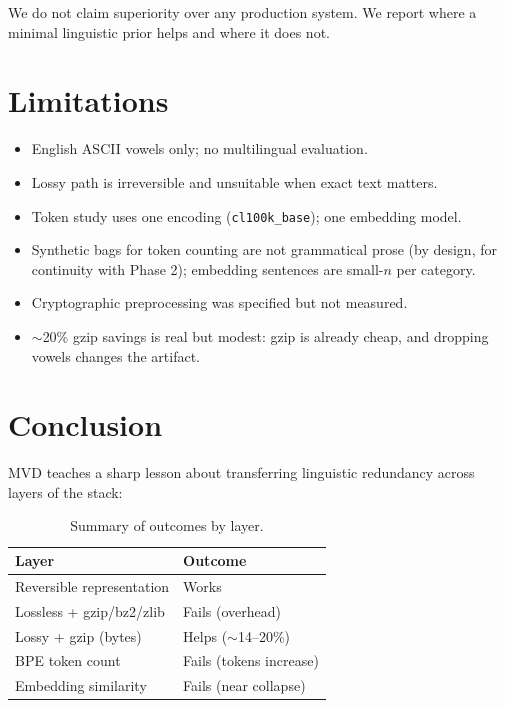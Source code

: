 \documentclass{article}
\begin{document}
We do not claim superiority over any production system. We report where a minimal linguistic prior helps and where it does not.

\section{Limitations}
\label{sec:limitations}

\begin{itemize}
	\item English ASCII vowels only; no multilingual evaluation.
	\item Lossy path is irreversible and unsuitable when exact text matters.
	\item Token study uses one encoding (\texttt{cl100k\_base}); one embedding model.
	\item Synthetic bags for token counting are not grammatical prose (by design, for continuity with Phase 2); embedding sentences are small-$n$ per category.
	\item Cryptographic preprocessing was specified but not measured.
	\item $\sim$20\% gzip savings is real but modest: gzip is already cheap, and dropping vowels changes the artifact.
\end{itemize}

\section{Conclusion}
\label{sec:conclusion}

MVD teaches a sharp lesson about transferring linguistic redundancy across layers of the stack:

\begin{table}[h]
	\caption{Summary of outcomes by layer.}
	\centering
	\begin{tabular}{ll}
		\toprule
		Layer                        & Outcome                    \\
		\midrule
		Reversible representation   & Works                      \\
		Lossless + gzip/bz2/zlib    & Fails (overhead)           \\
		Lossy + gzip (bytes)        & Helps ($\sim$14--20\%)     \\
		BPE token count             & Fails (tokens increase)    \\
		Embedding similarity        & Fails (near collapse)      \\
		\bottomrule
	\end{tabular}
	\label{tab:summary}
\end{table}
\end{document}

